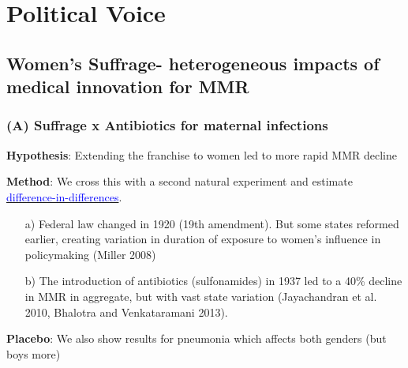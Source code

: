 \documentclass[9pt,letterpaper,subeqn]{beamer}
\begin{document}
\section{Political Voice}
\subsection{Women's Suffrage- heterogeneous impacts of medical innovation for MMR}
\begin{frame}[label=USAHistory]
\frametitle{(A) Suffrage x Antibiotics for maternal infections}
\textbf{Hypothesis}: Extending the franchise to women led to more rapid MMR decline \\
\vspace{3mm}

\textbf{Method}: We cross this with a second natural experiment and estimate \hyperlink{sulfDD}{\textcolor{blue}{difference-in-differences}}.
\begin{enumerate}
\item[a)] Federal law changed in 1920 (19th amendment). But some states reformed earlier, creating variation in duration of exposure to women's influence in policymaking (Miller 2008)
\item[b)] The introduction of antibiotics (sulfonamides) in 1937 led to a 40\% decline in MMR in aggregate, but with vast state variation (Jayachandran et al. 2010, Bhalotra and Venkataramani 2013).
\end{enumerate}
\vspace{3mm}
\textbf{Placebo}: We also show results for pneumonia which affects both genders (but boys more)%
\end{frame}
\end{document}
